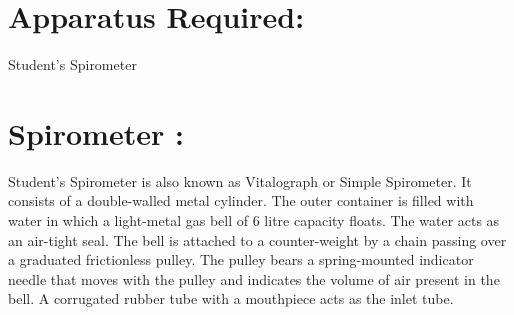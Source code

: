 \documentclass[a4paper,12pt,openany,oneside]{book}
\begin{document}
															\section*{Apparatus Required:}
															Student’s Spirometer
															\section*{Spirometer :}
															Student’s Spirometer is also known as Vitalograph or Simple Spirometer. It consists of a double-walled metal cylinder. The outer container is filled with water in which a light-metal gas bell of 6 litre capacity floats. The water acts as an air-tight seal. The bell is attached to a counter-weight by a chain passing over a graduated frictionless pulley. The pulley bears a spring-mounted indicator needle that moves with the pulley and indicates the volume of air present in the bell. A corrugated rubber tube with a mouthpiece acts as the inlet tube.
\end{document}
